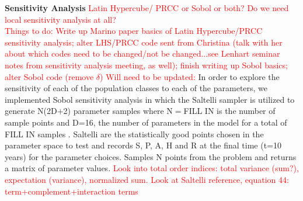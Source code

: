 \documentclass[12pt]{article}
\begin{document}









\textbf{Sensitivity Analysis} 
\textcolor{red}{Latin Hypercube/ PRCC or Sobol or both? Do we need local sensitivity analysis at all?} \\
\textcolor{red}{Things to do: Write up Marino paper basics of Latin Hypercube/PRCC sensitivity analysis; alter LHS/PRCC code sent from Christina (talk with her about which codes need to be changed/not be changed...see Lenhart seminar notes from sensitivity analysis meeting, as well); finish writing up Sobol basics; alter Sobol code (remove $\delta$)} 
\textcolor{red}{Will need to be updated:} In order to explore the sensitivity of each of the population classes to each of the parameters, we implemented Sobol sensitivity analysis in which the Saltelli sampler is utilized to generate N(2D+2) parameter samples where N$=$FILL IN is the number of sample points and D=16, the number of parameters in the model for a total of FILL IN samples \cite{Herman}. 
Saltelli are the statistically good points chosen in the parameter space to test and records S, P, A, H and R at the final time (t=10 years) for the parameter choices. Samples N points from the problem and returns a matrix of parameter values. 
\textcolor{red}{Look into total order indices: total variance (sum?), expectation (variance), normalized sum. Look at Saltelli reference, equation 44: term+complement+interaction terms} \\
\end{document}
